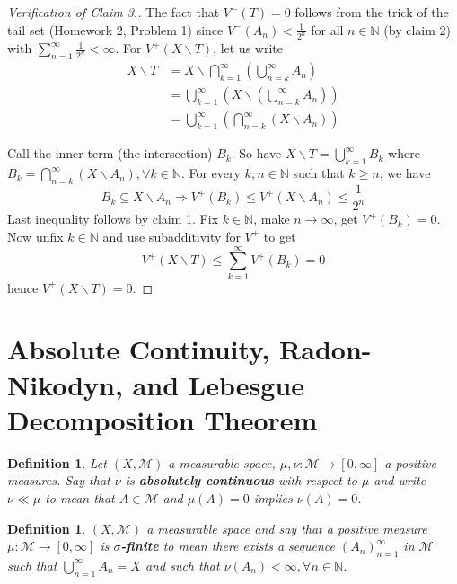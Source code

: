 \documentclass[letterpaper, 12pt]{article}
\newcommand{\cM}{\mathcal{M}}
\newcommand{\bN}{\mathbb{N}}
\providecommand{\mbrac}[1] {\left( #1 \right)}
\theoremstyle{stdthm}
\theoremstyle{stddef}
\newtheorem{defn}[thm]{Definition}
\theoremstyle{stdnonum}
\theoremstyle{stdqands}
\theoremstyle{stdbold}
\begin{document}
\begin{proof} [Verification of Claim 3.]
The fact that $V^-(T) = 0$ follows from the trick of the tail set (Homework 2, Problem 1) since $V^-(A_n) < \frac{1}{2^n}$ for all $n \in \bN$ (by claim 2) with $\sum_{n=1}^\infty \frac{1}{2^n} < \infty$. For $V^+(X\backslash T)$, let us write
\begin{align*}
X\backslash T &= X\backslash \bigcap_{k=1}^\infty \mbrac{\bigcup_{n=k}^\infty A_n}\\
&= \bigcup_{k=1}^\infty \mbrac{X \backslash \mbrac{\bigcup_{n=k}^\infty A_n}}\\
&= \bigcup_{k=1}^\infty \mbrac{\bigcap_{n=k}^\infty \mbrac{X \backslash A_n}}
\end{align*}

Call the inner term (the intersection) $B_k$. So have $X\backslash T = \bigcup_{k=1}^\infty B_k$ where $B_k = \bigcap_{n=k}^\infty (X\backslash A_n), \forall k \in \bN$. For every $k, n\in \bN$ such that $k \geq n$, we have
\[B_k \subseteq X \backslash A_n \Rightarrow V^+(B_k) \leq V^+(X \backslash A_n)  \leq \frac{1}{2^n} \]
Last inequality follows by claim 1. Fix $k \in \bN$, make $n\rightarrow \infty$, get $V^+(B_k) = 0$. Now unfix $k \in \bN$ and use subadditivity for $V^+$ to get 
\[V^+(X\backslash T) \leq \sum_{k=1}^\infty V^+(B_k) = 0 \]
hence $V^+(X\backslash T) = 0$. 
\end{proof}

\newpage
\section{Absolute Continuity, Radon-Nikodyn, and Lebesgue Decomposition Theorem}

\begin{defn}
Let $(X,\cM)$ a measurable space, $\mu,\nu: \cM \rightarrow [0,\infty]$ a positive measures. Say that $\nu$ is {\bf absolutely continuous} with respect to $\mu$ and write $\nu \ll \mu$ to mean that $A \in \cM$ and $\mu(A) = 0$ implies $\nu(A) = 0$. 
\end{defn}

\begin{defn}
$(X,\cM)$ a measurable space and say that a positive measure $\mu:\cM \rightarrow [0,\infty]$ is {\bf $\sigma$-finite} to mean there exists a sequence $(A_n)_{n=1}^\infty$ in $\cM$ such that $\bigcup_{n=1}^\infty A_n = X$ and such that $\nu(A_n) < \infty, \forall n \in \bN$. 
\end{defn}
\end{document}
